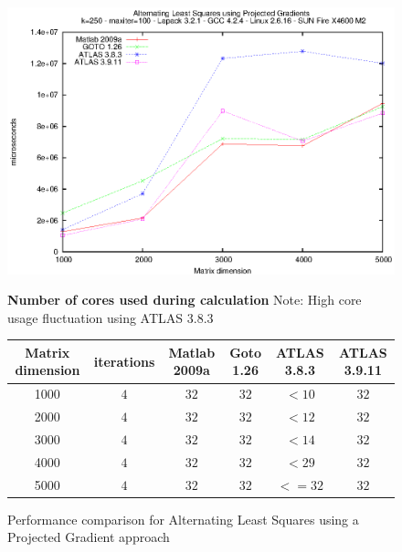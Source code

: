 \documentclass[a4paper,10pt]{scrartcl}
\begin{document}
	\begin{figure}
		\label{Figure4}	
		\includegraphics{nmf_alspg.eps}\newline

		
		\textbf{Number of cores used during calculation}\newline
		Note: High core usage fluctuation using ATLAS 3.8.3\newline

		\begin{tabular}{|c|c|c|c|c|c|}
			\hline
			Matrix dimension & iterations & Matlab 2009a & Goto 1.26 & ATLAS 3.8.3 & ATLAS 3.9.11\\
			\hline
			1000 & $4$ & $32$ & $32$ & $<10$ & $32$\\
			2000 & $4$ & $32$ & $32$ & $<12$ & $32$ \\
			3000 & $4$ & $32$ & $32$ & $<14$ & $32$\\
			4000 & $4$ & $32$ & $32$ & $<29$ & $32$\\
			5000 & $4$ & $32$ & $32$ & $<=32$ & $32$\\
			\hline
		\end{tabular}
		\caption{Performance comparison for Alternating Least Squares using a Projected Gradient approach}
	\end{figure}
\end{document}
